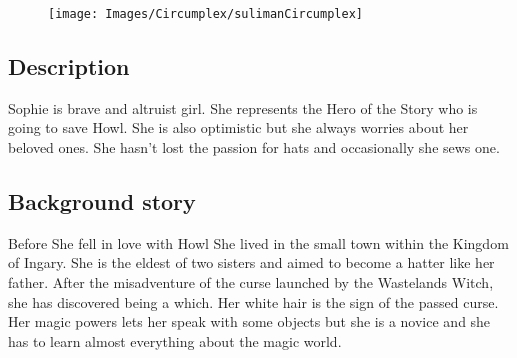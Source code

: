 \begin{figure}
    \centering
  \vspace*{5\baselineskip}
  \texttt{[image: Images/Circumplex/sulimanCircumplex]}
  \end{figure}

\subsection{Description}
Sophie is brave and altruist girl. She represents the Hero of the Story who is going to save Howl. She is also optimistic but she always worries about her beloved ones. She hasn’t lost the passion for hats and occasionally she sews one.

\subsection{Background story}
Before She fell in love with Howl She lived in the small town within the Kingdom of Ingary. She is the eldest of two sisters and aimed to become a hatter like her father. After the misadventure of the curse launched by the Wastelands Witch, she has discovered being a which. Her white hair is the sign of the passed curse. Her magic powers lets her speak with some objects but she is a novice and she has to learn almost everything about the magic world.

